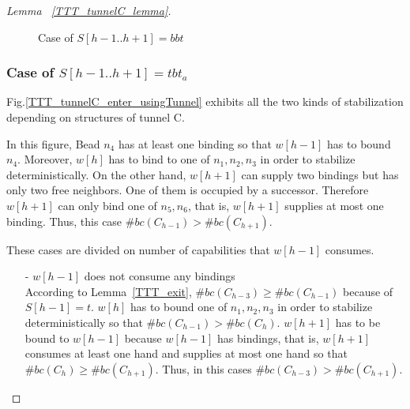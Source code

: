 \begin{proof}[Lemma~ \ref{TTT_tunnelC_lemma}]
\begin{figure}
\begin{center}
    \caption{Case of $S[h-1..h+1] = bbt$}
    \label{TTT_tunnelC_enter_usingBond}
  \end{center}
\end{figure}


\subsubsection{Case of $S[h-1..h+1] = tbt_a$}
Fig.\ref{TTT_tunnelC_enter_usingTunnel} exhibits all the two kinds of stabilization depending on structures of tunnel C.

  In this figure, Bead $n_4$ has at least one binding so that $w[h-1]$ has to bound $n_4$. Moreover, $w[h]$ has to bind to one of $n_1, n_2, n_3$ in order to stabilize deterministically. On the other hand, $w[h+1]$ can supply two bindings but has only two free neighbors. One of them is occupied by a successor. Therefore $w[h+1]$ can only bind one of $n_5, n_6$, that is, $w[h+1]$ supplies at most one binding. Thus, this case $\#bc(C_{h-1}) > \#bc(C_{h+1})$.

  These cases are divided on number of capabilities that $w[h-1]$ consumes.
  \begin{itemize}
  \item[-]{$w[h-1]$ does not consume any bindings}\\
  According to Lemma~\ref{TTT_exit}, $\#bc(C_{h-3}) \geq \#bc(C_{h-1})$ because of $S[h-1] = t$.
    $w[h]$ has to bound one of $n_1, n_2, n_3$ in order to stabilize deterministically so that  $\#bc(C_{h-1}) > \#bc(C_{h})$.
    $w[h+1]$ has to be bound to $w[h-1]$ because $w[h-1]$ has bindings, that is, $w[h+1]$ consumes at least one hand and supplies at most one hand so that $\#bc(C_{h}) \geq \#bc(C_{h+1})$. Thus, in this cases $\#bc(C_{h-3}) > \#bc(C_{h+1})$.


\end{itemize}
\end{proof}
